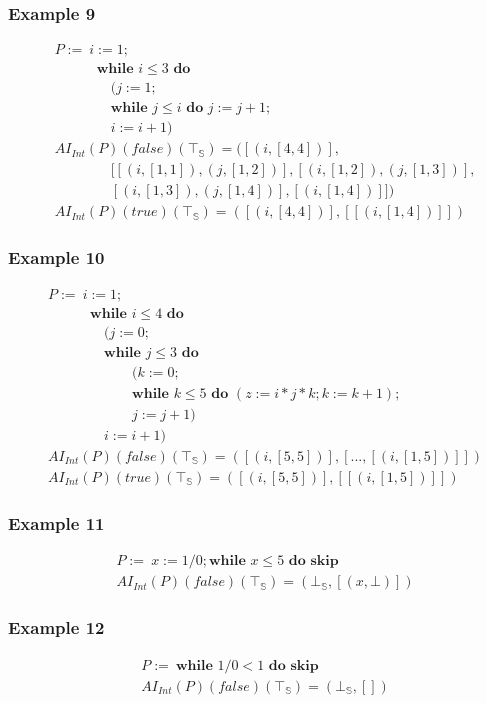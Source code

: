 \documentclass[aspectratio=169]{beamer}
\begin{document}
\begin{frame}
    \frametitle{Example 9}
    \begin{align*}
        &P :=\ i := 1;\\
        & \qquad \quad     \textbf {while } i \le 3 \textbf { do } \\
        & \qquad \qquad (j := 1; \\
        & \qquad \qquad \textbf {while } j \le i \textbf { do } j := j + 1; \\
        & \qquad \qquad i := i + 1) \\
        &AI_{Int} (P) (false) (\top_\mathbb{S}) = ([(i, [4, 4])], \\ 
        & \qquad \qquad [[(i, [1, 1]), (j, [1, 2])], [(i, [1, 2]), (j, [1, 3])], \\ 
        & \qquad \qquad [(i, [1, 3]), (j, [1, 4])], [(i, [1, 4])]]) \\
        &AI_{Int} (P) (true) (\top_\mathbb{S}) = ([(i, [4, 4])], [[(i, [1, 4])]])
    \end{align*}
\end{frame}

\begin{frame}
    \frametitle{Example 10}
    \begin{align*}
        &P :=\ i := 1;\\
        & \qquad \quad     \textbf {while } i \le 4 \textbf { do } \\
        & \qquad \qquad (j := 0; \\
        & \qquad \qquad \textbf {while } j \le 3 \textbf { do } \\
        & \qquad \qquad \qquad (k := 0; \\
        & \qquad \qquad \qquad\textbf {while } k \le 5 \textbf { do } (z := i * j * k; k := k + 1); \\
        & \qquad \qquad \qquad j := j + 1) \\
        & \qquad \qquad i := i + 1) \\
        &AI_{Int} (P) (false) (\top_\mathbb{S}) = ([(i, [5, 5])], [..., [(i, [1, 5])]]) \\
        &AI_{Int} (P) (true) (\top_\mathbb{S}) = ([(i, [5, 5])], [[(i, [1, 5])]])
    \end{align*}
\end{frame}

\begin{frame}
    \frametitle{Example 11}
    \begin{align*}
        &P :=\  x := 1 / 0; \textbf {while } x \le 5 \textbf { do skip}\\
        &AI_{Int} (P) (false) (\top_\mathbb{S}) = (\bot_\mathbb{S}, [(x, \bot)])
    \end{align*}
\end{frame}

\begin{frame}
    \frametitle{Example 12}
    \begin{align*}
        &P :=\ \textbf {while } 1 / 0 < 1 \textbf { do skip}\\
        &AI_{Int} (P) (false) (\top_\mathbb{S}) = (\bot_\mathbb{S}, [])
    \end{align*}
\end{frame}
\end{document}

